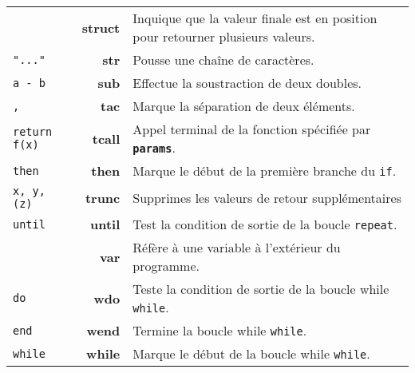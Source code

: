 \documentclass{article}
\begin{document}
\begin{longtable}{p{1.3cm} r p{12cm}}
  & \textbf{struct} & Inquique que la valeur finale est en position pour retourner plusieurs valeurs.\\
  {\lstset{style=lua}\lstinline$"..."$} & \textbf{str} & Pousse une chaîne de caractères.\\
  {\lstinline$a - b$} & \textbf{sub} & Effectue la soustraction de deux doubles.\\
  {\lstset{style=lua}\lstinline$,$} & \textbf{tac} & Marque la séparation de deux éléments.\\
  {\lstset{style=lua}\lstinline$return f(x)$} & \textbf{tcall} & Appel terminal de la fonction spécifiée par \texttt{\textbf{params}}.\\
  {\lstset{style=lua}\lstinline$then$} & \textbf{then} & Marque le début de la première branche du {\lstset{style=lua}\lstinline$if$}.\\
  {\lstset{style=lua}\lstinline$x, y, (z)$} & \textbf{trunc} & Supprimes les valeurs de retour supplémentaires\\
  {\lstset{style=lua}\lstinline$until$} & \textbf{until} & Test la condition de sortie de la boucle {\lstset{style=lua}\lstinline$repeat$}.\\
  {\lstset{style=lua}\lstinline$$} & \textbf{var} & Réfère à une variable à l'extérieur du programme.\\
  {\lstset{style=lua}\lstinline$do$} & \textbf{wdo} & Teste la condition de sortie de la boucle while {\lstset{style=lua}\lstinline$while$}.\\
  {\lstset{style=lua}\lstinline$end$} & \textbf{wend} & Termine la boucle while {\lstset{style=lua}\lstinline$while$}.\\
  {\lstset{style=lua}\lstinline$while$} & \textbf{while} & Marque le début de la boucle while {\lstset{style=lua}\lstinline$while$}.\\
  
  
\end{longtable}
\end{document}
